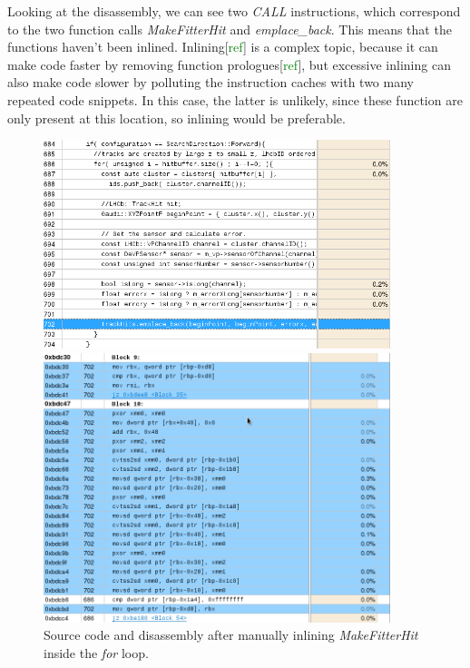 \documentclass[12pt]{article}
\begin{document}
Looking at the disassembly, we can see two \textit{CALL} instructions, which correspond to the two function calls \textit{MakeFitterHit} and \textit{emplace\_back}. This means that the functions haven't been inlined. Inlining[\textcolor{green}{ref}] is a complex topic, because it can make code faster by removing function prologues[\textcolor{green}{ref}], but excessive inlining can also make code slower by polluting the instruction caches with two many repeated code snippets. In this case, the latter is unlikely, since these function are only present at this location, so inlining would be preferable.

\begin{figure}[H]
	\begin{center}
		\includegraphics[width=0.9\textwidth]{kalmanfit_disasm_opt_src_inlined}
	\end{center}
	\begin{center}
		\includegraphics[width=0.9\textwidth]{kalmanfit_disasm_opt_asm_inlined}
	\end{center}
	\caption{Source code and disassembly after manually inlining \textit{MakeFitterHit} inside the \textit{for} loop.}
	\label{fig_kalman_disasm_src_inlined}
\end{figure}
\end{document}
